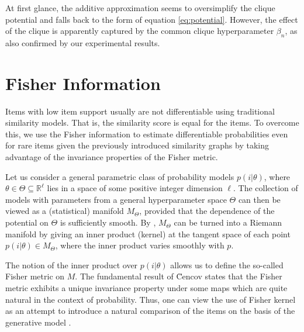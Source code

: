 At first glance, the additive approximation seems to oversimplify the clique potential and falls back to the form of equation \eqref{eq:potential}. However, the effect of the clique is apparently captured by the common clique hyperparameter $\beta_{n}$, as also confirmed by our experimental results. 

\section{Fisher Information}
\label{sec:fisher}

Items with low item support usually are not differentiable using traditional similarity models. That is, the similarity score is equal for the items. To overcome this, we use the Fisher information to estimate differentiable probabilities even for rare items given the previously introduced similarity graphs by taking advantage of the invariance properties of the Fisher metric.

Let us consider a general parametric class of probability models $p(i| \theta)$, where $\theta\in \Theta \subseteq \mathbb{R}^\ell$ lies in a space 
of some positive integer dimension $\ell$. The collection of models with parameters from a general hyperparameter space $\Theta$ can then be viewed as a (statistical) manifold $M_\Theta$, provided that the dependence of the potential on $\Theta$ is sufficiently smooth. By \cite{Jo}, $M_\Theta$ can be turned into a Riemann manifold by giving an inner product (kernel) at the tangent space of each point $p(i| \theta) \in M_\Theta$, where the inner product varies smoothly with $p$. 

The notion of the inner product over $p(i| \theta)$ allows us to define the so-called Fisher metric on $M$. The fundamental result of \u{C}encov \cite{cencov1982} states that the Fisher metric exhibits a unique invariance property under some maps which are quite natural in the context of probability. Thus, one can view the use of Fisher kernel as an attempt to introduce a natural comparison of the items on the basis of the generative model \cite{JH}. 

